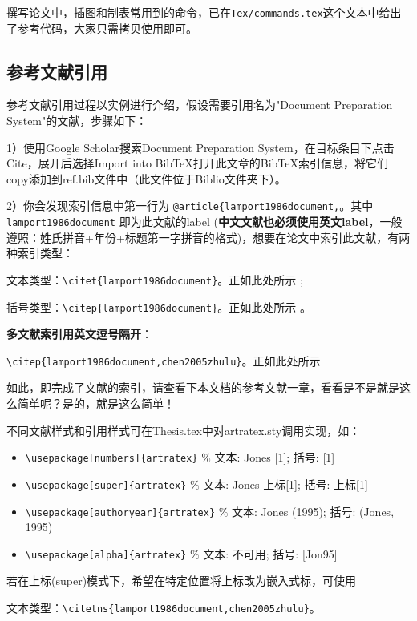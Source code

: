 撰写论文中，插图和制表常用到的命令，已在\verb|Tex/commands.tex|这个文本中给出了参考代码，大家只需拷贝使用即可。

\subsection{参考文献引用}

参考文献引用过程以实例进行介绍，假设需要引用名为"Document Preparation System"的文献，步骤如下：

1）使用Google Scholar搜索Document Preparation System，在目标条目下点击Cite，展开后选择Import into BibTeX打开此文章的BibTeX索引信息，将它们copy添加到ref.bib文件中（此文件位于Biblio文件夹下）。

2）你会发现索引信息中第一行为 \verb|@article{lamport1986document,|。其中 \verb|lamport1986document| 即为此文献的label (\textbf{中文文献也必须使用英文label}，一般遵照：姓氏拼音+年份+标题第一字拼音的格式)，想要在论文中索引此文献，有两种索引类型：

文本类型：\verb|\citet{lamport1986document}|。正如此处所示 \citet{lamport1986document}; 

括号类型：\verb|\citep{lamport1986document}|。正如此处所示 \citep{lamport1986document}。

\textbf{多文献索引用英文逗号隔开}：

\verb|\citep{lamport1986document,chen2005zhulu}|。正如此处所示 \citep{lamport1986document,chen2005zhulu}

如此，即完成了文献的索引，请查看下本文档的参考文献一章，看看是不是就是这么简单呢？是的，就是这么简单！

不同文献样式和引用样式可在Thesis.tex中对artratex.sty调用实现，如：
\begin{itemize}
    \footnotesize
    \item \verb+\usepackage[numbers]{artratex}+ $\%$ 文本: Jones [1]; 括号: [1]
    \item \verb+\usepackage[super]{artratex}+ $\%$ 文本: Jones 上标[1]; 括号: 上标[1]
    \item \verb+\usepackage[authoryear]{artratex}+ $\%$ 文本: Jones (1995); 括号: (Jones, 1995)
    \item \verb+\usepackage[alpha]{artratex}+ $\%$ 文本: 不可用; 括号: [Jon95]
\end{itemize}

若在上标(super)模式下，希望在特定位置将上标改为嵌入式标，可使用

文本类型：\verb|\citetns{lamport1986document,chen2005zhulu}|。

